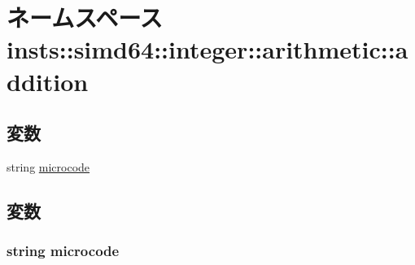 \hypertarget{namespaceinsts_1_1simd64_1_1integer_1_1arithmetic_1_1addition}{
\section{ネームスペース insts::simd64::integer::arithmetic::addition}
\label{namespaceinsts_1_1simd64_1_1integer_1_1arithmetic_1_1addition}
}
\subsection*{変数}
\begin{DoxyCompactItemize}
\item 
string \hyperlink{namespaceinsts_1_1simd64_1_1integer_1_1arithmetic_1_1addition_a770f11a173e99389a8802f0107ed8f52}{microcode}
\end{DoxyCompactItemize}


\subsection{変数}
\hypertarget{namespaceinsts_1_1simd64_1_1integer_1_1arithmetic_1_1addition_a770f11a173e99389a8802f0107ed8f52}{
\subsubsection[{microcode}]{\setlength{\rightskip}{0pt plus 5cm}string {\bf microcode}}}
\label{namespaceinsts_1_1simd64_1_1integer_1_1arithmetic_1_1addition_a770f11a173e99389a8802f0107ed8f52}
